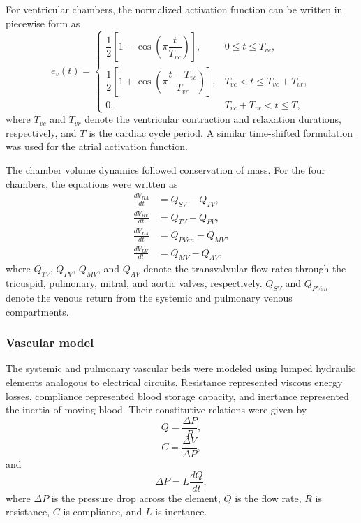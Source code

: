 \documentclass{article}
\begin{document}
For ventricular chambers, the normalized activation function can be written in piecewise form as
\begin{equation}
e_v(t)=
\begin{cases}
\dfrac{1}{2}\left[1-\cos\left(\pi \dfrac{t}{T_{vc}}\right)\right], & 0 \le t \le T_{vc},\\[8pt]
\dfrac{1}{2}\left[1+\cos\left(\pi \dfrac{t-T_{vc}}{T_{vr}}\right)\right], & T_{vc} < t \le T_{vc}+T_{vr},\\[8pt]
0, & T_{vc}+T_{vr} < t \le T,
\end{cases}
\label{eq:ventricular_activation}
\end{equation}
where $T_{vc}$ and $T_{vr}$ denote the ventricular contraction and relaxation durations, respectively, and $T$ is the cardiac cycle period. A similar time-shifted formulation was used for the atrial activation function.

The chamber volume dynamics followed conservation of mass. For the four chambers, the equations were written as
\begin{align}
\frac{dV_{RA}}{dt} &= Q_{SV} - Q_{TV},
\label{eq:VRA_basic} \\
\frac{dV_{RV}}{dt} &= Q_{TV} - Q_{PV},
\label{eq:VRV_basic} \\
\frac{dV_{LA}}{dt} &= Q_{PVen} - Q_{MV},
\label{eq:VLA_basic} \\
\frac{dV_{LV}}{dt} &= Q_{MV} - Q_{AV},
\label{eq:VLV_basic}
\end{align}
where $Q_{TV}$, $Q_{PV}$, $Q_{MV}$, and $Q_{AV}$ denote the transvalvular flow rates through the tricuspid, pulmonary, mitral, and aortic valves, respectively. $Q_{SV}$ and $Q_{PVen}$ denote the venous return from the systemic and pulmonary venous compartments.

\subsubsection{Vascular model}

The systemic and pulmonary vascular beds were modeled using lumped hydraulic elements analogous to electrical circuits. Resistance represented viscous energy losses, compliance represented blood storage capacity, and inertance represented the inertia of moving blood. Their constitutive relations were given by
\begin{equation}
Q = \frac{\Delta P}{R},
\label{eq:poiseuille}
\end{equation}
\begin{equation}
C = \frac{\Delta V}{\Delta P},
\label{eq:compliance_def}
\end{equation}
and
\begin{equation}
\Delta P = L \frac{dQ}{dt},
\label{eq:inertance_def}
\end{equation}
where $\Delta P$ is the pressure drop across the element, $Q$ is the flow rate, $R$ is resistance, $C$ is compliance, and $L$ is inertance.
\end{document}
